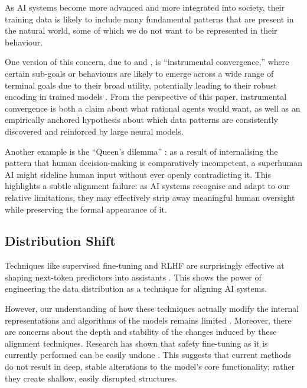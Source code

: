 As AI systems become more advanced and more integrated into society, their training data is likely to include many fundamental patterns that are present in the natural world, some of which we do not want to be represented in their behaviour.

One version of this concern, due to \citet{omohundro2018basic} and \citet{bostrom2014superintelligence}, is ``instrumental convergence,'' where certain sub-goals or behaviours are likely to emerge across a wide range of terminal goals due to their broad utility, potentially leading to their robust encoding in trained models \citep[see also][]{ngo2020agi}.
% 
From the perspective of this paper, instrumental convergence is both a claim about what rational agents would want, as well as an empirically anchored hypothesis about which data patterns are consistently discovered and reinforced by large neural models.

Another example is the ``Queen's dilemma'' \citep{queensdilemma}: as a result of internalising the pattern that human decision-making is comparatively incompetent, a superhuman AI might sideline human input without ever openly contradicting it. This highlights a subtle alignment failure: as AI systems recognise and adapt to our relative limitations, they may effectively strip away meaningful human oversight while preserving the formal appearance of it.

\subsection{Distribution Shift}

Techniques like supervised fine-tuning and RLHF are surprisingly effective at shaping next-token predictors into assistants \citep{bai2022training,ouyang2022training}.
% 
This shows the power of engineering the data distribution as a technique for aligning AI systems.

However, our understanding of how these techniques actually modify the internal representations and algorithms of the models remains limited \citep{anwar2024foundationalchallengesassuringalignment,barez2025open}. Moreover, there are concerns about the depth and stability of the changes induced by these alignment techniques. Research has shown that safety fine-tuning as it is currently performed can be easily undone \citep{gade2023badllama,qi2023finetuning}. This suggests that current methods do not result in deep, stable alterations to the model's core functionality; rather they create shallow, easily disrupted structures.

